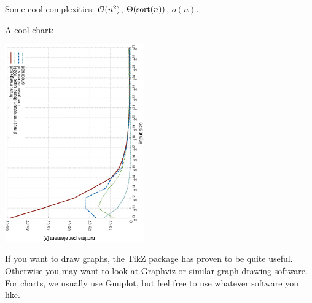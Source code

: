 \documentclass[german]{uebung}
\begin{document}
\begin{exercise}{2}
Some cool complexities: $\mathcal{O}(n^2)$, $\Theta(\mathrm{sort}(n))$, $o(n)$.
\end{exercise}

\begin{exercise}{3}
A cool chart:

\begin{center}
\includegraphics[width=6cm,angle=270]{chart.eps}
\end{center}
\end{exercise}

\begin{exercise}{4}
If you want to draw graphs, the TikZ package has proven to be quite useful. 
Otherwise you may want to look at Graphviz or similar graph drawing software. 
For charts, we usually use Gnuplot, but feel free to use whatever software 
you like.
\end{exercise}
\end{document}

